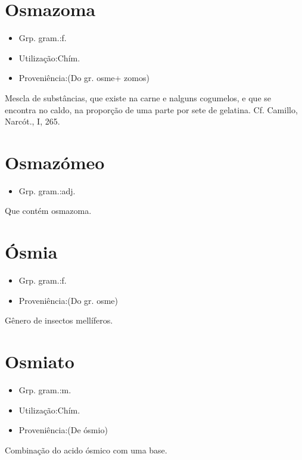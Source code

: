 \section{Osmazoma}
\begin{itemize}
\item {Grp. gram.:f.}
\end{itemize}
\begin{itemize}
\item {Utilização:Chím.}
\end{itemize}
\begin{itemize}
\item {Proveniência:(Do gr. \textunderscore osme\textunderscore  + \textunderscore zomos\textunderscore )}
\end{itemize}
Mescla de substâncias, que existe na carne e nalguns cogumelos, e que se encontra no caldo, na proporção de uma parte por sete de gelatina. Cf. Camillo, \textunderscore Narcót.\textunderscore , I, 265.
\section{Osmazómeo}
\begin{itemize}
\item {Grp. gram.:adj.}
\end{itemize}
Que contém osmazoma.
\section{Ósmia}
\begin{itemize}
\item {Grp. gram.:f.}
\end{itemize}
\begin{itemize}
\item {Proveniência:(Do gr. \textunderscore osme\textunderscore )}
\end{itemize}
Gênero de insectos mellíferos.
\section{Osmiato}
\begin{itemize}
\item {Grp. gram.:m.}
\end{itemize}
\begin{itemize}
\item {Utilização:Chím.}
\end{itemize}
\begin{itemize}
\item {Proveniência:(De \textunderscore ósmio\textunderscore )}
\end{itemize}
Combinação do acido ósmico com uma base.

